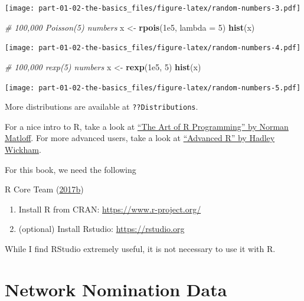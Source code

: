 \documentclass[]{book}
\newenvironment{Shaded}{\begin{snugshade}}{\end{snugshade}}
\newcommand{\CommentTok}[1]{\textcolor[rgb]{0.56,0.35,0.01}{\textit{#1}}}
\newcommand{\DataTypeTok}[1]{\textcolor[rgb]{0.13,0.29,0.53}{#1}}
\newcommand{\DecValTok}[1]{\textcolor[rgb]{0.00,0.00,0.81}{#1}}
\newcommand{\FloatTok}[1]{\textcolor[rgb]{0.00,0.00,0.81}{#1}}
\newcommand{\KeywordTok}[1]{\textcolor[rgb]{0.13,0.29,0.53}{\textbf{#1}}}
\newcommand{\NormalTok}[1]{#1}
\newcommand{\StringTok}[1]{\textcolor[rgb]{0.31,0.60,0.02}{#1}}
\begin{document}
\begin{enumerate}
  \texttt{[image: part-01-02-the-basics\_files/figure-latex/random-numbers-3.pdf]}

\begin{Shaded}
\begin{Highlighting}[]
\CommentTok{# 100,000 Poisson(5) numbers}
\NormalTok{x <-}\StringTok{ }\KeywordTok{rpois}\NormalTok{(}\FloatTok{1e5}\NormalTok{, }\DataTypeTok{lambda =} \DecValTok{5}\NormalTok{)}
\KeywordTok{hist}\NormalTok{(x)}
\end{Highlighting}
\end{Shaded}

  \texttt{[image: part-01-02-the-basics\_files/figure-latex/random-numbers-4.pdf]}

\begin{Shaded}
\begin{Highlighting}[]
\CommentTok{# 100,000 rexp(5) numbers}
\NormalTok{x <-}\StringTok{ }\KeywordTok{rexp}\NormalTok{(}\FloatTok{1e5}\NormalTok{, }\DecValTok{5}\NormalTok{)}
\KeywordTok{hist}\NormalTok{(x)}
\end{Highlighting}
\end{Shaded}

  \texttt{[image: part-01-02-the-basics\_files/figure-latex/random-numbers-5.pdf]}

  More distributions are available at \texttt{??Distributions}.
\end{enumerate}

For a nice intro to R, take a look at \href{https://nostarch.com/artofr.htm}{``The Art of R Programming'' by Norman Matloff}. For more advanced users, take a look at \href{http://adv-r.had.co.nz/}{``Advanced R'' by Hadley Wickham}.

For this book, we need the following

R Core Team (\protect\hyperlink{ref-R}{2017}\protect\hyperlink{ref-R}{b})

\begin{enumerate}
\def\labelenumi{\arabic{enumi}.}
\item
  Install R from CRAN: \url{https://www.r-project.org/}
\item
  (optional) Install Rstudio: \url{https://rstudio.org}
\end{enumerate}

While I find RStudio extremely useful, it is not necessary to use it with R.

\hypertarget{network-nomination-data}{%
\chapter{Network Nomination Data}\label{network-nomination-data}}
\end{document}
